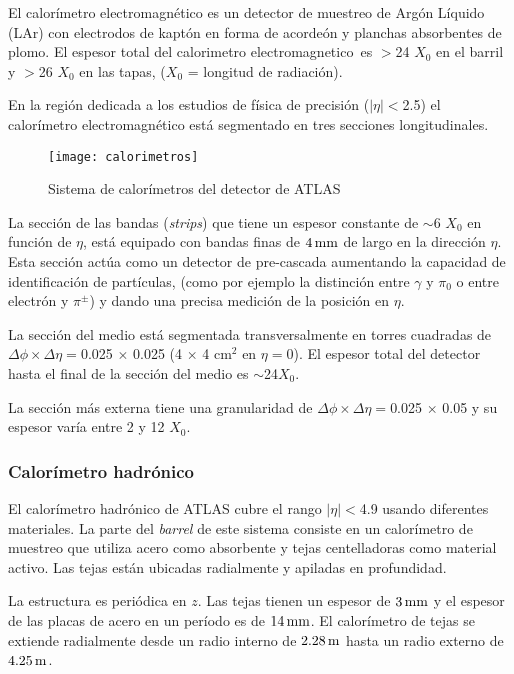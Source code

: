 El calorímetro electromagnético es un detector de muestreo de Argón Líquido
(LAr) con electrodos de kaptón en forma de acordeón y planchas absorbentes de
plomo. El espesor total del calorimetro electromagnetico\ es $>$24 $X_0$ en el
barril y $>$26 $X_0$ en las tapas, ($X_0$ = longitud de radiación).

En la región dedicada a los estudios de física de precisión ($|\eta|<$2.5) el
calorímetro electromagnético está segmentado en tres secciones longitudinales.

\begin{figure}[!htb]
  \centering

  \texttt{[image: calorimetros]}

  \caption{Sistema de calorímetros del detector de ATLAS}
  \label{fig:calorimetros}

\end{figure}

La sección de las bandas (\emph{strips}) que tiene un espesor constante de
$\sim$6 $X_0$ en función de $\eta$, está equipado con bandas finas de $\unit[4]{mm}$ de
largo en la dirección $\eta$. Esta sección actúa como un detector de pre-cascada
aumentando la capacidad de identificación de partículas,
(como por ejemplo la distinción entre $\gamma$ y $\pi_0$ o entre electrón y
$\pi^\pm$) y dando una precisa medición de la posición en $\eta$.

La sección del medio está segmentada transversalmente en torres cuadradas de
$\Delta \phi \times \Delta \eta=$0.025 $\times$ 0.025 (4 $\times$ 4 cm$^2$ en
$\eta=0$). El espesor total del detector hasta el final de la sección del medio
es $\sim$24$X_0$.

La sección más externa tiene una granularidad de
$\Delta\phi\times\Delta\eta=$0.025 $\times$ 0.05 y su espesor varía entre 2 y 12
$X_0$.

\subsubsection{Calorímetro hadrónico}

El calorímetro hadrónico de ATLAS \cite{calohadTDR} cubre el rango $|\eta|<$4.9
usando diferentes materiales.
La parte del \emph{barrel} de este sistema consiste en un calorímetro de muestreo que
utiliza acero como absorbente y tejas centelladoras como material activo. Las
tejas están ubicadas radialmente y apiladas en profundidad.

La estructura es periódica en $z$. Las tejas tienen un espesor de $\unit[3]{mm}$ y el
espesor de las placas de acero en un período es de $\unit[14]{mm}$.
El calorímetro de tejas se extiende radialmente desde un radio interno de $\unit[2.28]{m}$
hasta un radio externo de $\unit[4.25]{m}$.

